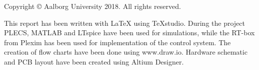 \thispagestyle{empty}
{\small
\strut\vfill %
\noindent Copyright \copyright{} Aalborg University 2018. All rights reserved.\par
\vspace{0.2cm}
\noindent This report has been written with \LaTeX{} using TeXstudio. During the project PLECS, MATLAB and LTspice have been used for simulations, while the RT-box from Plexim has been used for implementation of the control system. The creation of flow charts have been done using www.draw.io. Hardware schematic and PCB layout have been created using Altium Designer.

}
\clearpage

